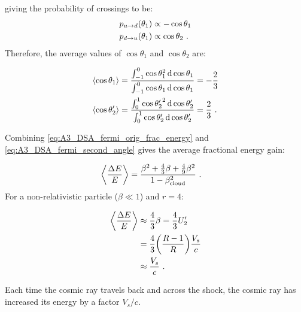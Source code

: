 \noindent giving the probability of crossings to be:
\begin{equation}
    \begin{aligned}
        p_{u\rightarrow d}\qty(\theta_1)&\propto -\cos\theta_1 \\
        p_{d\rightarrow u}\qty(\theta_1)&\propto \cos\theta_2  \text{ .}
    \end{aligned}
\end{equation}
\noindent Therefore, the average values of $\cos\theta_1$ and $\cos\theta_2$ are:

\begin{equation}
    \begin{aligned}
    \left\langle \cos\theta_1 \right\rangle&=\frac{\int_{-1}^{0} \cos\theta_1^2\dd{\cos\theta_1}}{\int_{-1}^{0}\cos\theta_1 \dd{\cos\theta_1}}=-\frac{2}{3} \\
    \left\langle \cos\theta_2' \right\rangle&=\frac{\int_{0}^{1} {\cos\theta_2'}^2\dd{\cos\theta_2'}}{\int_{0}^{1}\cos\theta_2' \dd{\cos\theta_2'}}=\frac{2}{3}\text{ .}
    \end{aligned} \label{eq:A3_DSA_fermi_second_angle}
\end{equation}

\noindent Combining \autoref{eq:A3_DSA_fermi_orig_frac_energy} and \autoref{eq:A3_DSA_fermi_second_angle} gives the average fractional energy gain:

\begin{equation}
    \begin{aligned}
    \left\langle \frac{\Delta E}{E} \right\rangle
	&=\frac{\beta^2+\frac{4}{3}\beta+\frac{4}{9}\beta^2}{1-\beta_\text{cloud}^2}\text{ .}
    \end{aligned} 
\end{equation}
\noindent For a non-relativistic particle ($\beta\ll 1$) and $r=4$:

\begin{equation}
    \begin{aligned}
    \left\langle \frac{\Delta E}{E} \right\rangle
	&\approx \frac{4}{3}\beta =\frac{4}{3}U_2'  \\
    &=\frac{4}{3}\qty(\frac{R-1}{R})\frac{V_s}{c} \\
    &\approx \frac{V_s}{c}\text{ .}
    \end{aligned} 
\end{equation}

Each time the cosmic ray travels back and across the shock, the cosmic ray has increased its energy by a factor $V_s/c$.